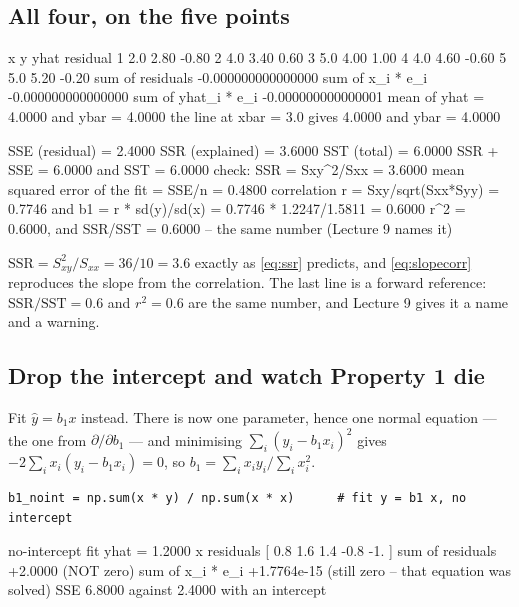 \documentclass[11pt]{article}
\begin{document}
\subsection{All four, on the five points}

\begin{codeout}
  x      y     yhat   residual
  1    2.0    2.80     -0.80
  2    4.0    3.40      0.60
  3    5.0    4.00      1.00
  4    4.0    4.60     -0.60
  5    5.0    5.20     -0.20
sum of residuals        -0.000000000000000
sum of x_i * e_i        -0.000000000000000
sum of yhat_i * e_i     -0.000000000000001
mean of yhat = 4.0000   and ybar = 4.0000
the line at xbar = 3.0 gives 4.0000   and ybar = 4.0000
\end{codeout}
\begin{codeout}
SSE (residual)  = 2.4000
SSR (explained) = 3.6000
SST (total)     = 6.0000
SSR + SSE       = 6.0000   and SST = 6.0000
check: SSR = Sxy^2/Sxx = 3.6000
mean squared error of the fit = SSE/n = 0.4800
correlation r = Sxy/sqrt(Sxx*Syy) = 0.7746
and b1 = r * sd(y)/sd(x) = 0.7746 * 1.2247/1.5811 = 0.6000
r^2 = 0.6000, and SSR/SST = 0.6000 -- the same number (Lecture 9 names it)
\end{codeout}

$\mathrm{SSR} = S_{xy}^2/S_{xx} = 36/10 = 3.6$ exactly as \eqref{eq:ssr}
predicts, and \eqref{eq:slopecorr} reproduces the slope from the correlation.
The last line is a forward reference: $\mathrm{SSR}/\mathrm{SST} = 0.6$ and
$r^2 = 0.6$ are the same number, and Lecture 9 gives it a name and a warning.

\subsection{Drop the intercept and watch Property 1 die}
\label{sec:nointercept}

Fit $\hat y = b_1x$ instead. There is now one parameter, hence one normal
equation --- the one from $\partial/\partial b_1$ --- and minimising
$\sum_i(y_i - b_1x_i)^2$ gives $-2\sum_i x_i(y_i - b_1x_i) = 0$, so
$b_1 = \sum_i x_iy_i / \sum_i x_i^2$.

\begin{lstlisting}
b1_noint = np.sum(x * y) / np.sum(x * x)      # fit y = b1 x, no intercept
\end{lstlisting}
\begin{codeout}
no-intercept fit  yhat = 1.2000 x
residuals         [ 0.8  1.6  1.4 -0.8 -1. ]
sum of residuals  +2.0000   (NOT zero)
sum of x_i * e_i  +1.7764e-15   (still zero -- that equation was solved)
SSE               6.8000  against 2.4000 with an intercept
\end{codeout}
\end{document}
